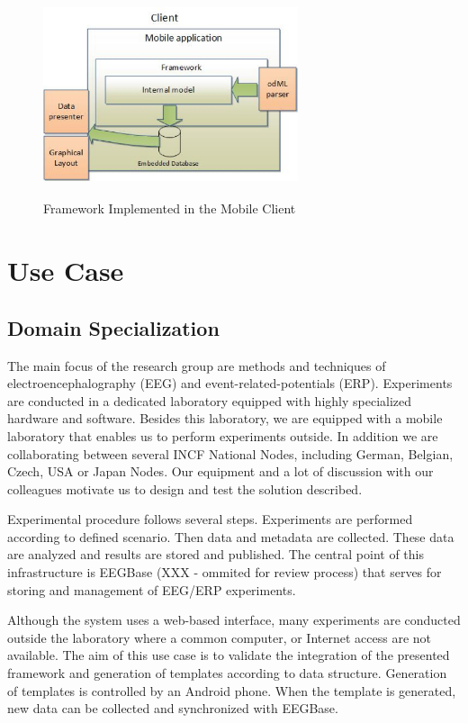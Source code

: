 \documentclass[a4paper,twoside]{article}
\begin{document}
\begin{figure}
\centering\includegraphics[width=7.5cm, height=6cm]{Client}
\caption{\label{client}Framework Implemented in the Mobile Client}
\end{figure}


\section{Use Case}

\subsection{Domain Specialization}

The main focus of the research group are methods and techniques of electroencephalography (EEG) and event-related-potentials (ERP). Experiments are conducted in a dedicated laboratory equipped with highly specialized hardware and software. Besides this laboratory, we are equipped with a mobile laboratory that enables us to perform experiments outside. In addition we are collaborating between several INCF National Nodes, including German, Belgian, Czech, USA or Japan Nodes. Our equipment and a lot of discussion with our colleagues motivate us to design and test the solution described.

Experimental procedure follows several steps.  Experiments are performed according to defined scenario. Then data and metadata are collected. These data are analyzed and results are stored and published. The central point of this infrastructure is EEGBase (XXX - ommited for review process) that serves for storing and management of EEG/ERP experiments.

Although the system uses a web-based interface, many experiments are conducted outside the laboratory where a common computer, or Internet access are not available. The aim of this use case is to validate the integration of the presented framework and generation of templates according to data structure. Generation of templates is controlled by an Android phone. When the template is generated, new data can be collected and synchronized with EEGBase.
\end{document}
